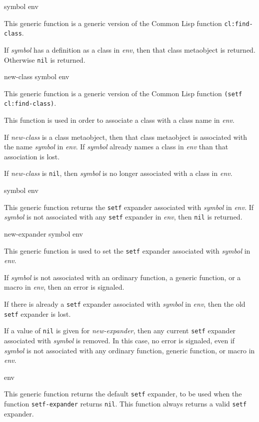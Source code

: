  {symbol env}

This generic function is a generic version of the Common Lisp
function \texttt{cl:find-class}.

If \textit{symbol} has a definition as a class in \textit{env}, then that
class metaobject is returned.  Otherwise \texttt{nil} is returned.

 {new-class symbol env}

This generic function is a generic version of the Common Lisp
function \texttt{(setf cl:find-class)}.

This function is used in order to associate a class with a class
name in \textit{env}.

If \textit{new-class} is a class metaobject, then that class
metaobject is associated with the name \textit{symbol}
in \textit{env}.  If \textit{symbol} already names a class
in \textit{env} than that association is lost.

If \textit{new-class} is \texttt{nil}, then \textit{symbol} is no
longer associated with a class in \textit{env}.

 {symbol env}

This generic function returns the \texttt{setf} expander associated with
\textit{symbol} in \textit{env}.  If \textit{symbol} is not associated
with any \texttt{setf} expander in \textit{env}, then \texttt{nil} is returned.

 {new-expander symbol env}

This generic function is used to set the \texttt{setf} expander associated
with \textit{symbol} in \textit{env}.

If \textit{symbol} is not associated with an ordinary function, a generic
function, or a macro in \textit{env}, then an error is signaled.

If there is already a \texttt{setf} expander associated with \textit{symbol} in
\textit{env}, then the old \texttt{setf} expander is lost.

If a value of \texttt{nil} is given for \textit{new-expander}, then
any current \texttt{setf} expander associated with \textit{symbol} is removed.
In this case, no error is signaled, even if \textit{symbol} is not
associated with any ordinary function, generic function, or macro
in \textit{env}.

 {env}

This generic function returns the default \texttt{setf} expander, to
be used when the function \texttt{setf-expander} returns \texttt{nil}.
This function always returns a valid \texttt{setf} expander.


